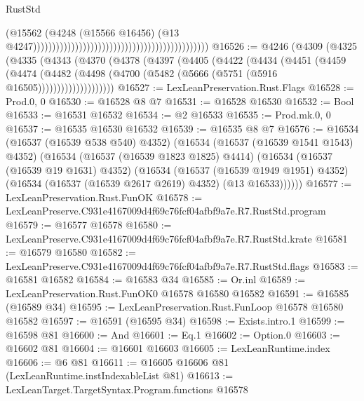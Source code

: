\begin{lexlean}{RustStd}
\begin{coremodule}
                                                                                          (@15562
                                                                                            (@4248
                                                                                              (@15566
                                                                                                @16456)
                                                                                              (@13
                                                                                                @4247))))))))))))))))))))))))))))))))))))))))))))))
@16526 := @4246
    (@4309
      (@4325
        (@4335
          (@4343
            (@4370
              (@4378
                (@4397
                  (@4405
                    (@4422
                      (@4434
                        (@4451
                          (@4459
                            (@4474
                              (@4482
                                (@4498 (@4700 (@5482 (@5666 (@5751 (@5916 @16505))))))))))))))))))))
@16527 := LexLeanPreservation.Rust.Flags
@16528 := Prod.{0, 0}
@16530 := @16528 @8 @7
@16531 := @16528 @16530
@16532 := Bool
@16533 := @16531 @16532
@16534 := @2 @16533
@16535 := Prod.mk.{0, 0}
@16537 := @16535 @16530 @16532
@16539 := @16535 @8 @7
@16576 := @16534
    (@16537 (@16539 @538 @540) @4352)
    (@16534
      (@16537 (@16539 @1541 @1543) @4352)
      (@16534
        (@16537 (@16539 @1823 @1825) @4414)
        (@16534
          (@16537 (@16539 @19 @1631) @4352)
          (@16534
            (@16537 (@16539 @1949 @1951) @4352)
            (@16534 (@16537 (@16539 @2617 @2619) @4352) (@13 @16533))))))
@16577 := LexLeanPreservation.Rust.FunOK
@16578 := LexLeanPreserve.C931e4167009d4f69c76fcf04afbf9a7e.R7.RustStd.program
@16579 := @16577 @16578
@16580 := LexLeanPreserve.C931e4167009d4f69c76fcf04afbf9a7e.R7.RustStd.krate
@16581 := @16579 @16580
@16582 := LexLeanPreserve.C931e4167009d4f69c76fcf04afbf9a7e.R7.RustStd.flags
@16583 := @16581 @16582
@16584 := @16583 @34
@16585 := Or.inl
@16589 := LexLeanPreservation.Rust.FunOK0 @16578 @16580 @16582
@16591 := @16585 (@16589 @34)
@16595 := LexLeanPreservation.Rust.FunLoop @16578 @16580 @16582
@16597 := @16591 (@16595 @34)
@16598 := Exists.intro.{1}
@16599 := @16598 @81
@16600 := And
@16601 := Eq.{1}
@16602 := Option.{0}
@16603 := @16602 @81
@16604 := @16601 @16603
@16605 := LexLeanRuntime.index
@16606 := @6 @81
@16611 := @16605 @16606 @81 (LexLeanRuntime.instIndexableList @81)
@16613 := LexLeanTarget.TargetSyntax.Program.functions @16578

\end{coremodule}
\end{lexlean}
